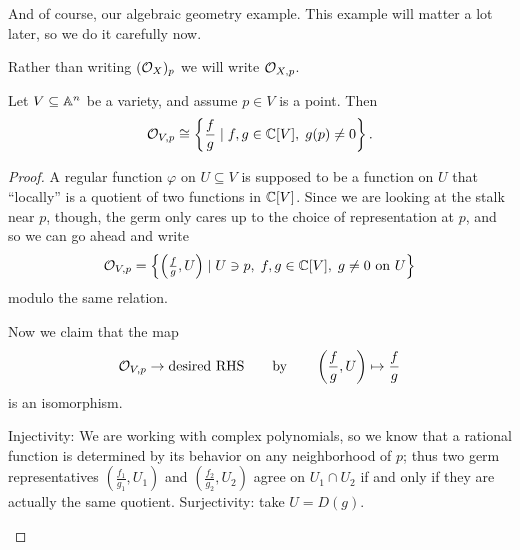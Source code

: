 And of course, our algebraic geometry example.
This example will matter a lot later,
so we do it carefully now.
\begin{abuse}
	Rather than writing $(\mathcal O_X)_p$ we will write $\mathcal O_{X,p}$.
\end{abuse}
\begin{theorem}
	[Stalks of $\OO_V$]
	\label{thm:stalks_affine_var}
	Let $V \subseteq \mathbb A^n$ be a variety,
	and assume $p \in V$ is a point.
	Then \[ \mathcal O_{V,p} \cong
		\left\{ \frac fg \mid f,g \in \mathbb C[V], \; g(p) \ne 0 \right\}. \]
\end{theorem}
\begin{proof}
	A regular function $\varphi$ on $U \subseteq V$
	is supposed to be a function on $U$ that ``locally'' is a quotient
	of two functions in $\mathbb C[V]$.
	Since we are looking at the stalk near $p$, though,
	the germ only cares up to the choice of representation at $p$,
	and so we can go ahead and write
	\[
		\mathcal O_{V,p} = 
		\left\{ \left( \tfrac fg , U \right) \mid 
			U \ni p, \; f,g \in \mathbb C[V], \;
			\text{$g \neq 0$ on $U$} \right\}
	\]
	modulo the same relation.

	Now we claim that the map
	\[ \mathcal O_{V,p} \to \text{desired RHS}
		\qquad\text{by}\qquad \left( \frac fg, U \right) \mapsto \frac fg \]
	is an isomorphism.
	\begin{itemize}
		\ii Injectivity: We are working with complex polynomials,
		so we know that a rational function is determined by its
		behavior on any neighborhood of $p$;
		thus two germ representatives $(\frac{f_1}{g_1}, U_1)$
		and $(\frac{f_2}{g_2}, U_2)$ agree on $U_1 \cap U_2$
		if and only if they are actually the same quotient.
		\ii Surjectivity: take $U = D(g)$. \qedhere
	\end{itemize}
\end{proof}

